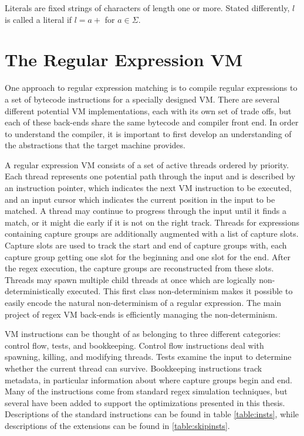 Literals are fixed strings of characters of length one or more.
Stated differently, $l$ is called a literal if $l = a+$ for $a \in \Sigma$.

\section{The Regular Expression VM}
\label{section:vm}

One approach to regular expression matching is to compile regular expressions
to a set of bytecode instructions for a specially designed VM. There
are several different potential VM implementations, each with its own
set of trade offs, but each of these back-ends share the same bytecode
and compiler front end. In order to understand the compiler, it
is important to first develop an understanding of the abstractions
that the target machine provides.

A regular expression VM consists of a set of active threads
ordered by priority. Each thread represents one potential
path through the input and is described by an instruction
pointer, which indicates the next VM instruction to be
executed, and an input cursor which indicates the current
position in the input to be matched. A thread may continue
to progress through the input until it finds a match, or
it might die early if it is not on the right track. Threads for
expressions containing capture groups are additionally augmented with
a list of capture slots. Capture slots are used to
track the start and end of capture groups with, each capture
group getting one slot for the beginning and one slot for the
end. After the regex execution, the capture groups
are reconstructed from these slots.  Threads may spawn multiple child
threads at once which are logically non-deterministically executed.
This first class non-determinism makes it possible to easily encode
the natural non-determinism of a regular expression. The main
project of regex VM back-ends is efficiently managing the non-determinism.

VM instructions can be thought of as belonging to three different categories:
control flow, tests, and bookkeeping. Control flow instructions deal with
spawning, killing, and modifying threads. Tests examine the input to determine
whether the current thread can survive. Bookkeeping instructions track metadata,
in particular information about where capture groups begin and end.
Many of the instructions come from standard regex simulation
techniques, but several have been added to support the optimizations
presented in this thesis. Descriptions of the standard instructions 
can be found in table \ref{table:insts}, while descriptions of the
extensions can be found in \ref{table:skipinsts}.

